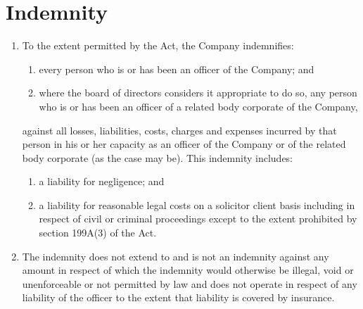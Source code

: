 \section{Indemnity}

\begin{enumerate}[label=(\alph*)]
    \item To the extent permitted by the Act, the Company indemnifies:
    \begin{enumerate}[label=(\roman*)]
        \item every person who is or has been an officer of the Company; and
        \item where the board of directors considers it appropriate to do so, any person who is or has been an officer of a related body corporate of the Company,
    \end{enumerate}
    
    against all losses, liabilities, costs, charges and expenses incurred by that person in his or her capacity as an officer of the Company or of the related body corporate (as the case may be). This indemnity includes:
    
    \begin{enumerate}[label=(\Alph*)]
        \item a liability for negligence; and
        \item a liability for reasonable legal costs on a solicitor client basis including in respect of civil or criminal proceedings except to the extent prohibited by section 199A(3) of the Act.
    \end{enumerate}
    
    \item The indemnity does not extend to and is not an indemnity against any amount in respect of which the indemnity would otherwise be illegal, void or unenforceable or not permitted by law and does not operate in respect of any liability of the officer to the extent that liability is covered by insurance.
    

\end{enumerate}
